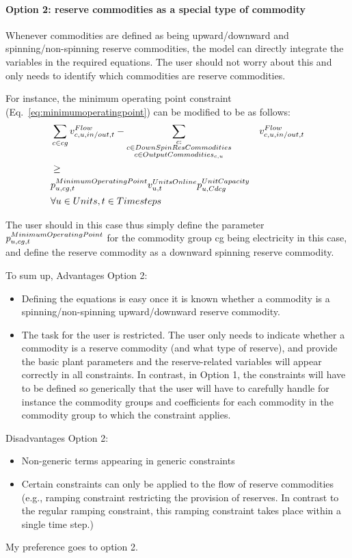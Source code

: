 \paragraph{Option 2: reserve commodities as a special type of commodity}
Whenever commodities are defined as being upward/downward and spinning/non-spinning reserve commodities, the model can directly integrate the variables in the required equations. The user should not worry about this and only needs to identify which commodities are reserve commodities. 

For instance, the minimum operating point constraint (Eq.~\eqref{eq:minimumoperatingpoint}) can be modified to be as follows:
\begin{align}
&\sum_{c \in cg} v^{Flow}_{c,u,in/out,t} - \sum_{\substack{c :  \\
													c \in DownSpinResCommodities \\
													c \in OutputCommodities_{c,u}}}
										&v^{Flow}_{c,u,in/out,t} \nonumber \\
										&\ge \nonumber \\
& p^{MinimumOperatingPoint}_{u,cg,t} v^{UnitsOnline}_{u,t} p^{UnitCapacity}_{u,Cdcg} \nonumber \\
& \forall u \in Units, t \in Timesteps
\end{align}

The user should in this case thus simply define the parameter $p^{MinimumOperatingPoint}_{u,cg,t}$ for the commodity group cg being electricity in this case, and define the reserve commodity as a downward spinning reserve commodity.

To sum up,
Advantages Option 2:
\begin{itemize}
\item Defining the equations is easy once it is known whether a commodity is a spinning/non-spinning upward/downward reserve commodity.
\item The task for the user is restricted. The user only needs to indicate whether a commodity is a reserve commodity (and what type of reserve), and provide the basic plant parameters and the reserve-related variables will appear correctly in all constraints. In contrast, in Option 1, the constraints will have to be defined so generically that the user will have to carefully handle for instance the commodity groups and coefficients for each commodity in the commodity group to which the constraint applies.
\end{itemize}
Disadvantages Option 2:
\begin{itemize}
\item Non-generic terms appearing in generic constraints
\item Certain constraints can only be applied to the flow of reserve commodities (e.g., ramping constraint restricting the provision of reserves. In contrast to the regular ramping constraint, this ramping constraint takes place within a single time step.)
\end{itemize}

My preference goes to option 2.